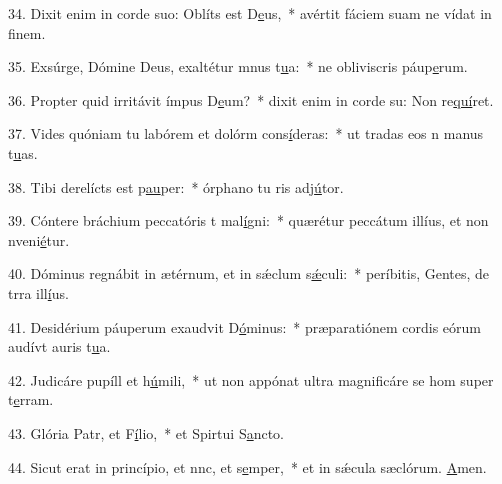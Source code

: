 34. Dixit enim in corde suo: Oblíts est D\uline{e}us,~* avértit fáciem suam ne vídat in f\uline{i}nem.\par 
35. Exsúrge, Dómine Deus, exaltétur mnus t\uline{u}a:~* ne obliviscris páup\uline{e}rum.\par 
36. Propter quid irritávit ímpus D\uline{e}um?~* dixit enim in corde su: Non re\uline{quí}ret.\par 
37. Vides quóniam tu labórem et dolórm cons\uline{í}deras:~* ut tradas eos n manus t\uline{u}as.\par 
38. Tibi derelícts est p\uline{au}per:~* órphano tu ris adj\uline{ú}tor.\par 
39. Cóntere bráchium peccatóris t mal\uline{í}gni:~* quærétur peccátum illíus, et non nveni\uline{é}tur.\par 
40. Dóminus regnábit in ætérnum, et in sǽclum s\uline{ǽ}culi:~* períbitis, Gentes, de trra ill\uline{í}us.\par 
41. Desidérium páuperum exaudvit D\uline{ó}minus:~* præparatiónem cordis eórum audívt auris t\uline{u}a.\par 
42. Judicáre pupíll et h\uline{ú}mili,~* ut non appónat ultra magnificáre se hom super t\uline{e}rram.\par 
43. Glória Patr, et F\uline{í}lio,~* et Spirtui S\uline{a}ncto.\par 
44. Sicut erat in princípio, et nnc, et s\uline{e}mper,~* et in sǽcula sæclórum. \uline{A}men.\par 
